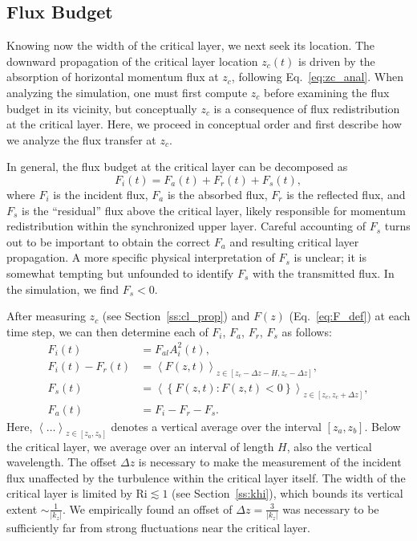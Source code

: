 \documentclass[
        fleqn,
        usenatbib,
        referee,
    ]{mnras}
\newcommand*{\abs}[1]{\left|#1\right|}
\newcommand*{\ev}[1]{\left\langle#1\right\rangle}
\newcommand*{\z}[1]{\left\{#1\right\}}
\begin{document}
\subsection{Flux Budget}\label{ss:flux_budget}

Knowing now the width of the critical layer, we next seek its location. The
downward propagation of the critical layer location $z_c(t)$ is driven by the
absorption of horizontal momentum flux at $z_c$, following
Eq.~\eqref{eq:zc_anal}. When analyzing the simulation, one must first compute
$z_c$ before examining the flux budget in its vicinity, but conceptually $z_c$
is a consequence of flux redistribution at the critical layer. Here, we proceed
in conceptual order and first describe how we analyze the flux transfer at
$z_c$.

In general, the flux budget at the critical layer can be decomposed as
\begin{equation}
    F_i(t) = F_a(t) + F_r(t) + F_s(t),\label{eq:f_budget}
\end{equation}
where $F_i$ is the incident flux, $F_a$ is the absorbed flux, $F_r$ is the
reflected flux, and $F_s$ is the ``residual'' flux above the critical layer,
likely responsible for momentum redistribution within the synchronized upper
layer. Careful accounting of $F_s$ turns out to be important to obtain the
correct $F_a$ and resulting critical layer propagation. A more specific physical
interpretation of $F_s$ is unclear; it is somewhat tempting but unfounded to
identify $F_s$ with the transmitted flux. In the simulation, we find $F_s < 0$.

After measuring $z_c$ (see Section~\ref{ss:cl_prop}) and $F(z)$
(Eq.~\eqref{eq:F_def}) at each time step, we can then determine each of $F_i$,
$F_a$, $F_r$, $F_s$ as follows:
\begin{align}
    F_i(t) &= F_{al}A_i^2(t),\\
    F_i(t) - F_r(t) &= \ev{F(z, t)}_{z \in [z_c - \Delta z - H, z_c - \Delta z]}
        ,\label{eq:fr_def}\\
    F_s(t) &= \ev{\z{F(z, t): F(z, t) < 0}}_{z \in [z_c, z_c + \Delta z]},
        \label{eq:fs_def}\\
    F_a(t) &= F_i - F_r - F_s.\label{eq:fa_def}
\end{align}
Here, $\ev{\dots}_{z \in [z_a, z_b]}$ denotes a vertical average over the
interval $[z_a, z_b]$. Below the critical layer, we average over an interval of
length $H$, also the vertical wavelength. The offset $\Delta z$ is necessary to
make the measurement of the incident flux unaffected by the turbulence within
the critical layer itself. The width of the critical layer is limited by
$\mathrm{Ri} \lesssim 1$ (see Section~\ref{ss:khi}), which bounds its vertical
extent $\sim \frac{1}{\abs{k_{z}}}$. We empirically found an offset of $\Delta z
= \frac{3}{\abs{k_z}}$ was necessary to be sufficiently far from strong
fluctuations near the critical layer.
\end{document}
